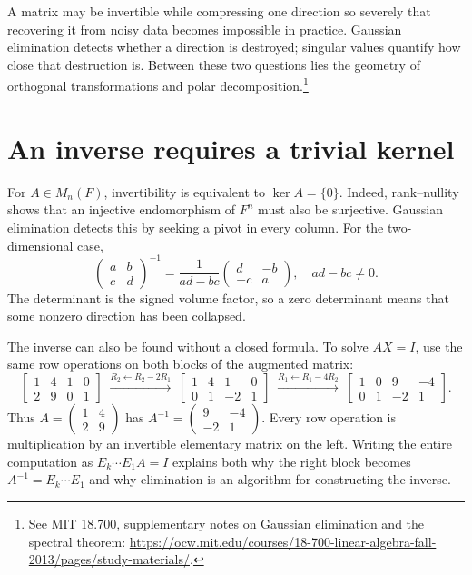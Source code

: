 
A matrix may be invertible while compressing one direction so severely that recovering it from noisy data becomes impossible in practice. Gaussian elimination detects whether a direction is destroyed; singular values quantify how close that destruction is. Between these two questions lies the geometry of orthogonal transformations and polar decomposition.\footnote{See MIT 18.700, supplementary notes on Gaussian elimination and the spectral theorem: \url{https://ocw.mit.edu/courses/18-700-linear-algebra-fall-2013/pages/study-materials/}.}

\section{An inverse requires a trivial kernel}

For \(A\in M_n(F)\), invertibility is equivalent to \(\ker A=\{0\}\). Indeed, rank--nullity shows that an injective endomorphism of \(F^n\) must also be surjective. Gaussian elimination detects this by seeking a pivot in every column. For the two-dimensional case,
\[
 \begin{pmatrix}a&b\\c&d\end{pmatrix}^{-1}
 =\frac1{ad-bc}\begin{pmatrix}d&-b\\-c&a\end{pmatrix},
 \quad ad-bc\ne0.
\]
The determinant is the signed volume factor, so a zero determinant means that some nonzero direction has been collapsed.

The inverse can also be found without a closed formula. To solve $AX=I$, use the same row operations on both blocks of the augmented matrix:
\[
 \left[\begin{array}{cc|cc}
  1&4&1&0\\ 2&9&0&1
 \end{array}\right]
 \;\xrightarrow{R_2\gets R_2-2R_1}\;
 \left[\begin{array}{cc|cc}
  1&4&1&0\\ 0&1&-2&1
 \end{array}\right]
 \;\xrightarrow{R_1\gets R_1-4R_2}\;
 \left[\begin{array}{cc|cc}
  1&0&9&-4\\ 0&1&-2&1
 \end{array}\right].
\]
Thus $A=\left(\begin{smallmatrix}1&4\\2&9\end{smallmatrix}\right)$ has
$A^{-1}=\left(\begin{smallmatrix}9&-4\\-2&1\end{smallmatrix}\right)$.
Every row operation is multiplication by an invertible elementary matrix on the left. Writing the entire computation as $E_k\cdots E_1A=I$ explains both why the right block becomes $A^{-1}=E_k\cdots E_1$ and why elimination is an algorithm for constructing the inverse.

